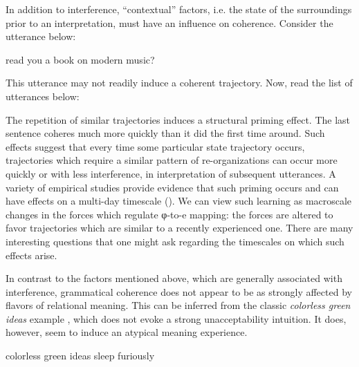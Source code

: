   In addition to interference, “contextual” factors, i.e. the state of the surroundings prior to an interpretation, must have an influence on coherence. Consider the utterance below:

  \ea
    {read you a book on modern music?}
\z

This utterance may not readily induce a coherent trajectory. Now, read the list of utterances below:

\ea
{}
\z
\z

  The repetition of similar trajectories induces a structural priming effect. The last sentence coheres much more quickly than it did the first time around. Such effects suggest that every time some particular state trajectory occurs, trajectories which require a similar pattern of re-organizations can occur more quickly or with less interference, in interpretation of subsequent utterances. A variety of empirical studies provide evidence that such priming occurs and can have effects on a multi-day timescale (\citealt{BockEtAl2007,VSFerreiraEtAl2006,Nagata1988,Nagata1992,PickeringFerreira2008,RowlandEtAl2012}). We can view such learning as macroscale changes in the forces which regulate φ-to-e mapping: the forces are altered to favor trajectories which are similar to a recently experienced one. There are many interesting questions that one might ask regarding the timescales on which such effects arise.

In contrast to the factors mentioned above, which are generally associated with interference, grammatical coherence does not appear to be as strongly affected by flavors of relational meaning. This can be inferred from the classic \textit{colorless green ideas} example \citep{Chomsky1956}, which does not evoke a strong unacceptability intuition. It does, however, seem to induce an atypical meaning experience.
 
\ea
colorless green ideas sleep furiously
\z 

